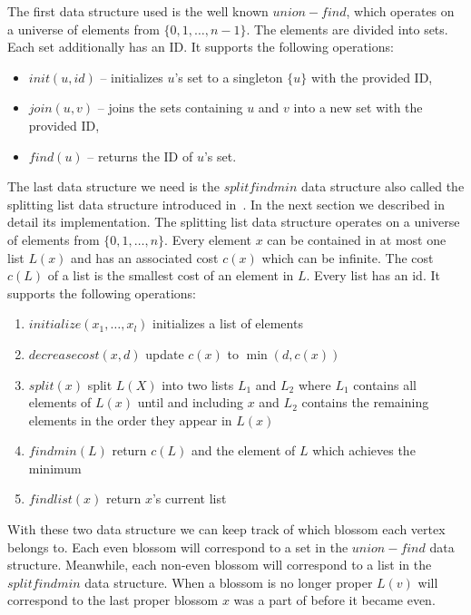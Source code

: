The first data structure used is the well known $union-find$, which operates on a universe of elements from $\{ 0, 1, \dots, n-1 \}$. The elements are divided into sets. Each set additionally has an ID\@. It supports the following operations:

\begin{itemize}
    \item $init(u, id)$ – initializes $u$'s set to a singleton $\{u\}$ with the provided ID,
    \item $join(u, v)$ – joins the sets containing $u$ and $v$ into a new set with the provided ID,
    \item $find(u)$ – returns the ID of $u$'s set.
\end{itemize}

The last data structure we need is the $splitfindmin$ data structure also called the splitting list data structure introduced in~\cite{gabow1985scaling}. In the next section we described in detail its implementation. The splitting list data structure operates on a universe of elements from $\{0, 1, \dots, n\}$. Every element $x$ can be contained in at most one list $L(x)$ and has an associated cost $c(x)$ which can be infinite. The cost $c(L)$ of a list is the smallest cost of an element in $L$. Every list has an id. It supports the following operations:

\begin{enumerate}
    \item $initialize(x_1, \dots, x_l)$ initializes a list of elements
    \item $decreasecost(x, d)$ update $c(x)$ to $\min(d, c(x))$
    \item $split(x)$ split $L(X)$ into two lists $L_1$ and $L_2$ where $L_1$ contains all elements of $L(x)$ until and including $x$ and $L_2$ contains the remaining elements in the order they appear in $L(x)$
    \item $findmin(L)$ return $c(L)$ and the element of $L$ which achieves the minimum
    \item $findlist(x)$ return $x$'s current list
\end{enumerate}

With these two data structure we can keep track of which blossom each vertex belongs to. Each even blossom will correspond to a set in the $union-find$ data structure. Meanwhile, each non-even blossom will correspond to a list in the $splitfindmin$ data structure. When a blossom is no longer proper $L(v)$ will correspond to the last proper blossom $x$ was a part of before it became even.


